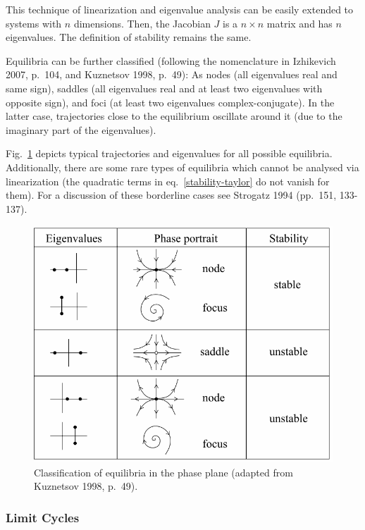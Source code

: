 \documentclass[12pt,a4paper,]{report}
\begin{document}
This technique of linearization and eigenvalue analysis can be easily
extended to systems with $n$ dimensions. Then, the Jacobian $J$ is a
$n \times n$ matrix and has $n$ eigenvalues. The definition of stability
remains the same.

Equilibria can be further classified (following the nomenclature in
Izhikevich 2007, p.~104, and Kuznetsov 1998, p.~49): As nodes (all
eigenvalues real and same sign), saddles (all eigenvalues real and at
least two eigenvalues with opposite sign), and foci (at least two
eigenvalues complex-conjugate). In the latter case, trajectories close
to the equilibrium oscillate around it (due to the imaginary part of the
eigenvalues).

Fig.~\ref{equilibria-classification} depicts typical trajectories and
eigenvalues for all possible equilibria. Additionally, there are some
rare types of equilibria which cannot be analysed via linearization (the
quadratic terms in eq.~\ref{stability-taylor} do not vanish for them).
For a discussion of these borderline cases see Strogatz 1994 (pp.~151,
133-137).

\begin{figure}
\centering
\includegraphics[]{images/Kuznetsov_1998_p_49_adapted.png}
\caption[Classification of equilibria in the phase plane]{Classification of equilibria in the phase plane (adapted
from Kuznetsov 1998, p.~49).}\label{equilibria-classification}
\end{figure}

\subsubsection{Limit Cycles}\label{limit-cycles}
\end{document}
